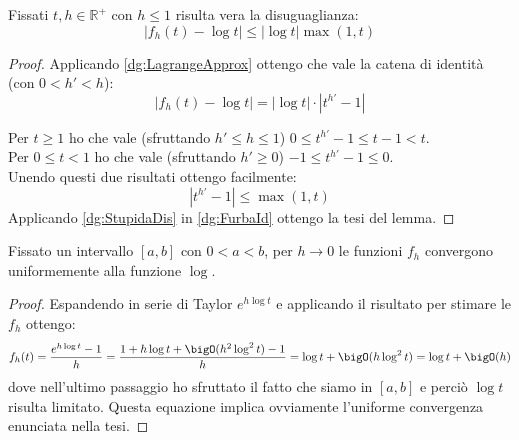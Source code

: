 \begin{lemma}\label{dg:DisEstremale}
	Fissati $t,h\in\mathbb{R^+}$ con $h\le1$ risulta vera la disuguaglianza:
	\begin{equation*}
		\left\lvert f_h(t)-\log{t}\right\rvert\le \left\lvert\log{t}\right\rvert\max(1,t)
	\end{equation*}
\end{lemma}
\begin{proof}
	Applicando \cref{dg:LagrangeApprox} ottengo che vale la catena di identità (con $0<h'<h$):
	\begin{equation}\label{dg:FurbaId}
		\left\lvert f_h(t)-\log{t}\right\rvert=\left\lvert\log{t}\right\rvert \cdot \left\lvert t^{h'}-1\right\rvert
	\end{equation}
	
	Per $t\ge 1$ ho che vale (sfruttando $h'\le h\le 1$) $0\le t^{h'}-1\le t-1<t$.\\
	Per $0\le t<1$ ho che vale (sfruttando $h'\ge0$) $-1\le t^{h'}-1\le 0$.\\
	Unendo questi due risultati ottengo facilmente:
	\begin{equation}\label{dg:StupidaDis}
		\left\lvert t^{h'}-1\right\rvert \le \max(1,t)
	\end{equation}
	Applicando \cref{dg:StupidaDis} in \cref{dg:FurbaId} ottengo la tesi del lemma.
\end{proof}

\begin{lemma}\label{dg:UnifConv}
	Fissato un intervallo $[a,b]$ con $0<a<b$, per $h\to 0$ le funzioni $f_h$ convergono uniformemente alla funzione $\log$.
\end{lemma}
\begin{proof}
	Espandendo in serie di Taylor $e^{h\log{t}}$ e applicando il risultato per stimare le $f_h$ ottengo:
	\begin{equation*}
		f_h(t)=\frac{e^{h\log{t}}-1}h=\frac{1+h\log{t}+\bigO(h^2\log^2{t})-1}{h}=\log{t}+\bigO(h\log^2{t})=\log{t}+\bigO(h)
	\end{equation*}
	dove nell'ultimo passaggio ho sfruttato il fatto che siamo in $[a,b]$ e perciò $\log{t}$ risulta limitato.
	Questa equazione implica ovviamente l'uniforme convergenza enunciata nella tesi.

\end{proof}

